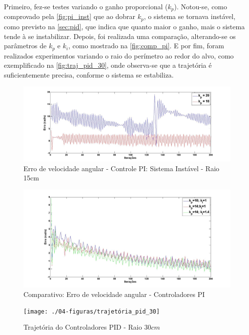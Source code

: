 Primeiro, fez-se testes variando o ganho proporcional ($k_{p}$). Notou-se, como comprovado pela \autoref{fig:pi_inst} que ao dobrar $k_{p}$, o sistema se tornava instável, como previsto na \autoref{sec:pid}, que indica que quanto maior o ganho, mais o sistema tende à se instabilizar. Depois, foi realizada uma comparação, alterando-se os parâmetros de $k_{p}$ e $k_{i}$, como mostrado na \autoref{fig:comp_pi}. E por fim, foram realizados experimentos variando o raio do perímetro ao redor do alvo, como exemplificado na \autoref{fig:traj_pid_30}, onde observa-se que a trajetória é suficientemente precisa, conforme o sistema se estabiliza. 
\begin{figure}[!htb]
	\centering
	\includegraphics[width=1.0\textwidth]{./04-figuras/pi_inst}
	\caption{Erro de velocidade angular - Controle PI: Sistema Instável - Raio 15cm}
	\label{fig:pi_inst}
\end{figure}
\begin{figure}[!htb]
	\centering
	\includegraphics[width=1.0\textwidth]{./04-figuras/comparativoPI}
	\caption{Comparativo: Erro de velocidade angular - Controladores PI}
	\label{fig:comp_pi}
\end{figure}

\begin{figure}[!htb]
	\centering
	\texttt{[image: ./04-figuras/trajetória\_pid\_30]}
	\caption{Trajetória do Controladores PID - Raio $30cm$}
	\label{fig:traj_pid_30}
	\end{figure}

